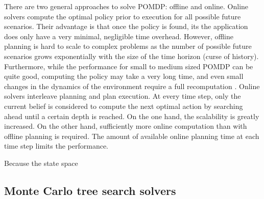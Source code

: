 \noindent
There are two general approaches to solve POMDP: offline and online. Online solvers compute the optimal policy prior to execution for all possible future scenarios. Their advantage is that once the policy is found, its the application does only have a very minimal, negligible time overhead. However, offline planning is hard to scale to complex problems as the number of possible future scenarios grows exponentially with the size of the time horizon (curse of history). Furthermore, while the performance for small to medium sized POMDP can be quite good, computing the policy may take a very long time, and even small changes in the dynamics of the environment require a full recomputation \parencite{online_pomdp}. Online solvers interleave planning and plan execution. At every time step, only the current belief is considered to compute the next optimal action by searching ahead until a certain depth is reached. On the one hand, the scalability is greatly increased. On the other hand, sufficiently more online computation than with offline planning is required. The amount of available online planning time at each time step limits the performance. 

Because the state space 



\subsection{Monte Carlo tree search solvers}

